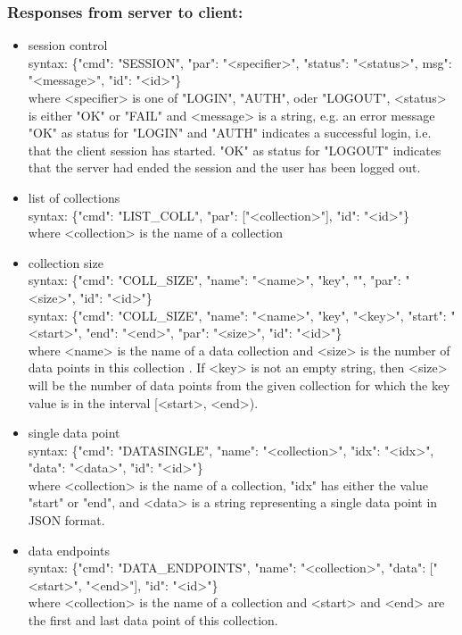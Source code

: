 \documentclass[oneside, english, final]{design}
\begin{document}
\subsubsection{Responses from server to client:}
\begin{itemize}
	\item{session control}
	      \\
	      syntax: \{"cmd": "SESSION", "par": "<specifier>", "status": "<status>", msg": "<message>", "id": "<id>"\} \\
	      where <specifier> is one of "LOGIN", "AUTH", oder "LOGOUT", <status> is either "OK" or "FAIL" and <message> is a string, e.g. an error message\\
	      "OK" as status for "LOGIN" and "AUTH" indicates a successful login, i.e. that the client session has started. "OK" as status for "LOGOUT" indicates that the server had ended the session and the user has been logged out.

	\item{list of collections}
	      \\
	      syntax: \{"cmd": "LIST\_COLL", "par": ["<collection>"], "id": "<id>"\} \\
	      where <collection> is the name of a collection

	\item{collection size}
	      \\
	      syntax: \{"cmd": "COLL\_SIZE", "name": "<name>", "key", "", "par": "<size>", "id": "<id>"\} \\
	      syntax: \{"cmd": "COLL\_SIZE", "name": "<name>", "key", "<key>", "start": "<start>", "end": "<end>", "par": "<size>", "id": "<id>"\} \\
	      where <name> is the name of a data collection and <size> is the number of data points in this collection . If <key> is not an empty string, then <size> will be the number of data points from the given collection for which the key value is in the interval [<start>, <end>).

	\item{single data point}
	      \\
	      syntax: \{"cmd": "DATASINGLE", "name": "<collection>", "idx": "<idx>", "data": "<data>", "id": "<id>"\} \\
	      where <collection> is the name of a collection, "idx" has either the value "start" or "end", and <data> is a string representing a single data point in JSON format.

	\item{data endpoints}
	      \\
	      syntax: \{"cmd": "DATA\_ENDPOINTS", "name": "<collection>", "data": ["<start>", "<end>"], "id": "<id>"\} \\
	      where <collection> is the name of a collection and <start> and <end> are the first and last data point of this collection.


\end{itemize}
\end{document}
